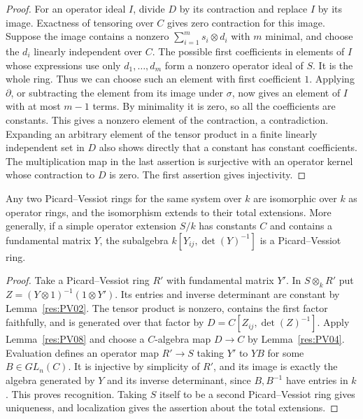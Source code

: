 \begin{proof}
For an operator ideal \(I\), divide \(D\) by its contraction and
replace \(I\) by its image. Exactness of tensoring over \(C\) gives
zero contraction for this image. Suppose the image contains a
nonzero \(\sum_{i=1}^m s_i\otimes d_i\) with \(m\) minimal,
and choose the \(d_i\) linearly independent over \(C\).
The possible first coefficients in elements of \(I\) whose
expressions use only \(d_1,\dots,d_m\) form a nonzero operator
ideal of \(S\). It is the whole ring. Thus we can choose such
an element with first coefficient \(1\). Applying \(\partial\),
or subtracting the element from its image under \(\sigma\), now
gives an element of \(I\) with at most \(m-1\) terms. By minimality
it is zero, so all the coefficients are constants. This gives
a nonzero element of the contraction, a contradiction.
Expanding an arbitrary element of the tensor product in a finite
linearly independent set in \(D\) also shows directly that a
constant has constant coefficients. The multiplication map in
the last assertion is surjective with an operator kernel
whose contraction to \(D\) is zero. The first assertion gives
injectivity.
\end{proof}

\begin{theorem}
\label{res:PV09}
Any two Picard--Vessiot rings for the same system over \(k\) are
isomorphic over \(k\) as operator rings, and the isomorphism
extends to their total extensions. More generally, if a simple
operator extension \(S/k\) has constants \(C\) and contains a
fundamental matrix \(Y\), the subalgebra
\(k[Y_{ij},\det(Y)^{-1}]\) is a Picard--Vessiot ring.
\end{theorem}

\begin{proof}
Take a Picard--Vessiot ring \(R'\) with fundamental matrix \(Y'\).
In \(S\otimes_k R'\) put
\(Z=(Y\otimes1)^{-1}(1\otimes Y')\). Its entries and inverse
determinant are constant by Lemma~\ref{res:PV02}.
The tensor product is nonzero, contains the first factor faithfully,
and is generated over that factor by
\(D=C[Z_{ij},\det(Z)^{-1}]\). Apply Lemma~\ref{res:PV08}
and choose a \(C\)-algebra map \(D\to C\) by
Lemma~\ref{res:PV04}. Evaluation defines an operator map
\(R'\to S\) taking \(Y'\) to \(YB\) for some \(B\in GL_n(C)\).
It is injective by simplicity of \(R'\), and its image is
exactly the algebra generated by \(Y\) and its inverse
determinant, since \(B,B^{-1}\) have entries in \(k\).
This proves recognition. Taking \(S\) itself to be a second
Picard--Vessiot ring gives uniqueness, and localization gives
the assertion about the total extensions.
\end{proof}

